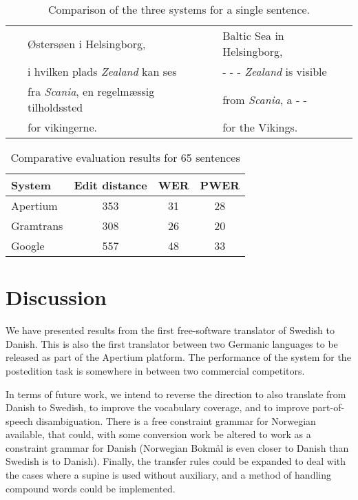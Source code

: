 \documentclass[11pt]{article}
\begin{document}
\begin{table*}
\begin{tabular}{|c|l|l|}
~          & Østersøen i Helsingborg,                         & Baltic Sea in Helsingborg, \\
~          & i hvilken plads \emph{Zealand} kan ses           & - - - \emph{Zealand} is visible \\
~          & fra \emph{Scania}, en regelmæssig tilholdssted   & from \emph{Scania}, a - - \\
~          & for vikingerne.                                  & for the Vikings. \\
\hline 
\end{tabular}
 \label{table:extranslations}
 \caption{Comparison of the three systems for a single sentence.}
\end{table*}

\begin{table}
\centering
\begin{tabular}{|l|c|c|c|}
\hline
System & Edit distance & WER & PWER\\
\hline
Apertium  & 353   & 31    & 28 \\
Gramtrans & 308   & 26    & 20 \\
Google    & 557   & 48    & 33 \\
\hline
\end{tabular}
    \caption{Comparative evaluation results for 65 sentences}
    \label{table:compeval}
\end{table}

\section{Discussion}

We have presented results from the first free-software translator of Swedish to Danish. This
is also the first translator between two Germanic languages to be released as part of the 
Apertium platform. The performance of the system for the postedition task is somewhere in between 
two commercial competitors. 

In terms of future work, we intend to reverse the direction to also translate from Danish to 
Swedish, to improve the vocabulary coverage, and to improve part-of-speech disambiguation. There
is a free constraint grammar for Norwegian \citep{hagen2000cbt} available, that could, with some
conversion work be altered to work as a constraint grammar for Danish (Norwegian Bokmål is even
closer to Danish than Swedish is to Danish). Finally, the transfer rules could be expanded to 
deal with the cases where a supine is used without auxiliary, and a method of handling compound
words could be implemented.
\end{document}
